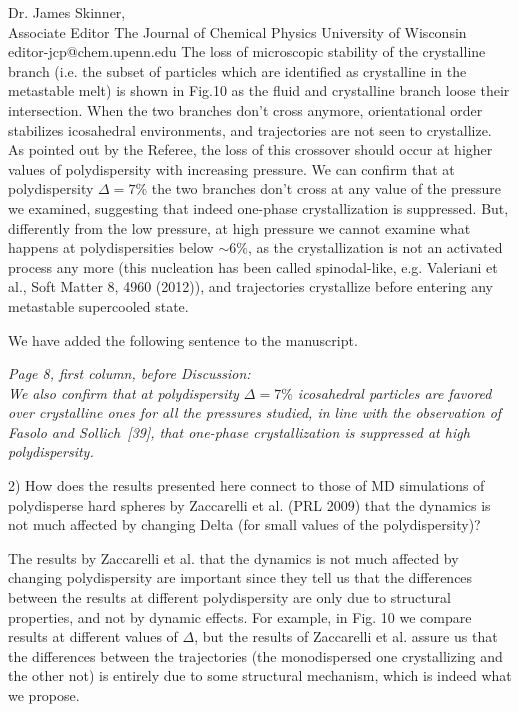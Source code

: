 \documentclass[a4paper, rebuttal, parskip=true, firsthead=false, fromemail=false, foldmarks=false]{scrlttr2}
\begin{document}
\begin{letter}{Dr. James Skinner,\\Associate Editor
The Journal of Chemical Physics
University of Wisconsin\\
editor-jcp@chem.upenn.edu }
The loss of microscopic stability of the crystalline branch (i.e. the subset of particles which are identified as crystalline in the metastable melt)
is shown in Fig.10 as the fluid and crystalline branch loose their intersection. When the two branches don't cross anymore, orientational order
stabilizes icosahedral environments, and trajectories are not seen to crystallize. As pointed out by the Referee,
the loss of this crossover should occur at higher values of polydispersity with
increasing pressure. We can confirm that at polydispersity $\Delta=7\%$ the two branches don't cross at any value of the pressure we examined, suggesting
that indeed one-phase crystallization is suppressed. But, differently from the low pressure, at high pressure we cannot examine
what happens at polydispersities below $\sim 6\%$, as the crystallization is not an activated process any more
(this nucleation has been called spinodal-like, e.g. Valeriani et al., Soft Matter 8, 4960 (2012)), and trajectories crystallize
before entering any metastable supercooled state.

We have added the following sentence to the manuscript.

{\it Page 8, first column, before Discussion:\\
We also confirm that at polydispersity $\Delta=7\%$ icosahedral particles are favored over crystalline ones for
all the pressures studied, in line with the observation of Fasolo and Sollich~[39], that
one-phase crystallization is suppressed at high polydispersity.
}



\begin{quotationi}
2) How does the results presented here connect to those of MD simulations of polydisperse hard spheres by Zaccarelli et al. (PRL 2009) that the dynamics is not much affected by changing Delta (for small values of the polydispersity)?
\end{quotationi}

The results by Zaccarelli et al. that the dynamics is not much affected by changing polydispersity are important since they tell
us that the differences between the results at different polydispersity are only due to structural properties, and not by
dynamic effects. For example, in Fig. 10 we compare results at different values of $\Delta$, but the results of Zaccarelli et al.
assure us that the differences between the trajectories (the monodispersed one crystallizing and the other not) is entirely due
to some structural mechanism, which is indeed what we propose.


\end{letter}
\end{document}
